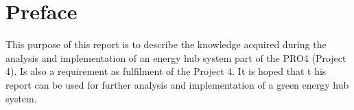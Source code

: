 \section*{Preface}
This purpose of this report is to describe the knowledge acquired during the analysis and implementation of an energy hub system part of the PRO4 (Project 4). Is also a requirement as fulfilment of the Project 4.
\p
It is hoped that t his report can be used for further analysis and implementation of a green energy hub system.
\p